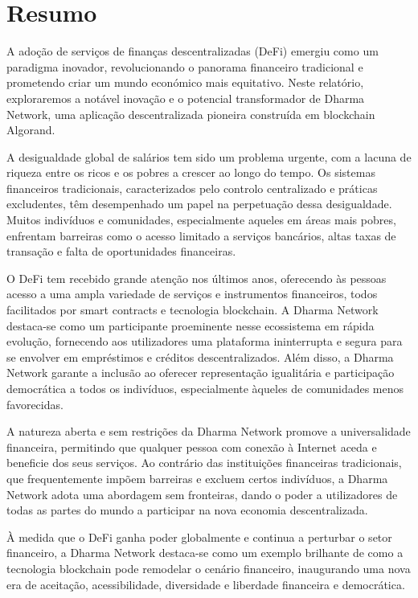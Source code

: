 \chapter*{Resumo}

A adoção de serviços de finanças descentralizadas (DeFi) emergiu como um paradigma inovador, revolucionando o panorama financeiro tradicional e prometendo criar um mundo económico mais equitativo. Neste relatório, exploraremos a notável inovação e o potencial transformador de Dharma Network, uma aplicação descentralizada pioneira construída em blockchain Algorand.\newline

A desigualdade global de salários tem sido um problema urgente, com a lacuna de riqueza entre os ricos e os pobres a crescer ao longo do tempo. Os sistemas financeiros tradicionais, caracterizados pelo controlo centralizado e práticas excludentes, têm desempenhado um papel na perpetuação dessa desigualdade. Muitos indivíduos e comunidades, especialmente aqueles em áreas mais pobres, enfrentam barreiras como o acesso limitado a serviços bancários, altas taxas de transação e falta de oportunidades financeiras.\newline

O DeFi tem recebido grande atenção nos últimos anos, oferecendo às pessoas acesso a uma ampla variedade de serviços e instrumentos financeiros, todos facilitados por smart contracts e tecnologia blockchain. A Dharma Network destaca-se como um participante proeminente nesse ecossistema em rápida evolução, fornecendo aos utilizadores uma plataforma ininterrupta e segura para se envolver em empréstimos e créditos descentralizados. Além disso, a Dharma Network garante a inclusão ao oferecer representação igualitária e participação democrática a todos os indivíduos, especialmente àqueles de comunidades menos favorecidas.\newline

A natureza aberta e sem restrições da Dharma Network promove a universalidade financeira, permitindo que qualquer pessoa com conexão à Internet aceda e beneficie dos seus serviços. Ao contrário das instituições financeiras tradicionais, que frequentemente impõem barreiras e excluem certos indivíduos, a Dharma Network adota uma abordagem sem fronteiras, dando o poder a utilizadores de todas as partes do mundo a participar na nova economia descentralizada.\newline

À medida que o DeFi ganha poder globalmente e continua a perturbar o setor financeiro, a Dharma Network destaca-se como um exemplo brilhante de como a tecnologia blockchain pode remodelar o cenário financeiro, inaugurando uma nova era de aceitação, acessibilidade, diversidade e liberdade financeira e democrática. \newline

